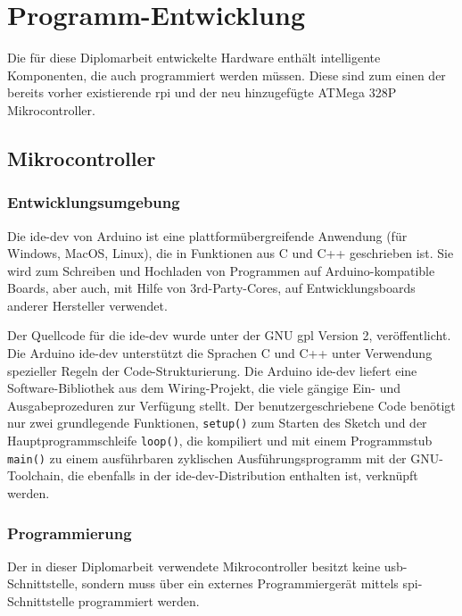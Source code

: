 \section{Programm-Entwicklung}
Die für diese Diplomarbeit entwickelte Hardware enthält intelligente Komponenten, die auch programmiert werden müssen.
Diese sind zum einen der bereits vorher existierende \ac{rpi} und der neu hinzugefügte ATMega 328P Mikrocontroller.
\subsection{Mikrocontroller}
\subsubsection{Entwicklungsumgebung}
Die \ac{ide-dev} von Arduino ist eine plattformübergreifende Anwendung (für Windows, MacOS, Linux), die in Funktionen aus C und C++ geschrieben ist.
Sie wird zum Schreiben und Hochladen von Programmen auf Arduino-kompatible Boards, aber auch, mit Hilfe von 3rd-Party-Cores, auf Entwicklungsboards anderer Hersteller verwendet.

Der Quellcode für die \ac{ide-dev} wurde unter der GNU \ac{gpl} Version 2, veröffentlicht.
Die Arduino \ac{ide-dev} unterstützt die Sprachen C und C++ unter Verwendung spezieller Regeln der Code-Strukturierung.
Die Arduino \ac{ide-dev} liefert eine Software-Bibliothek aus dem Wiring-Projekt, die viele gängige Ein- und Ausgabeprozeduren zur Verfügung stellt.
Der benutzergeschriebene Code benötigt nur zwei grundlegende Funktionen, \texttt{setup()} zum Starten des Sketch und der Hauptprogrammschleife \texttt{loop()}, die kompiliert und mit einem Programmstub \texttt{main()} zu einem ausführbaren zyklischen Ausführungsprogramm mit der GNU-Toolchain, die ebenfalls in der \ac{ide-dev}-Distribution enthalten ist, verknüpft werden.

\subsubsection{Programmierung}
Der in dieser Diplomarbeit verwendete Mikrocontroller besitzt keine \ac{usb}-Schnittstelle, sondern muss über ein externes Programmiergerät mittels \ac{spi}-Schnittstelle programmiert werden.

